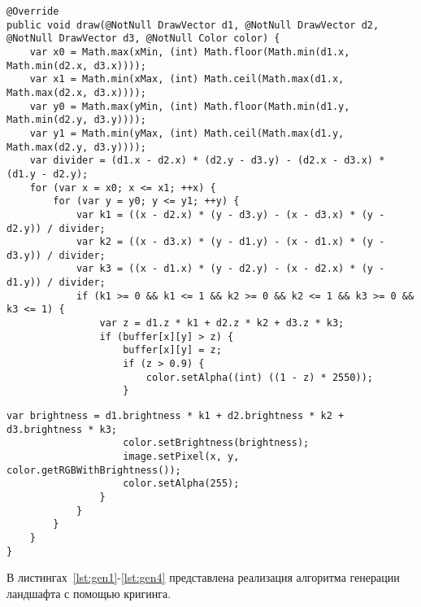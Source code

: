 \begin{lstlisting}[label=lst:z-buffer1,caption=Реализация алгоритма отрисовки полигона (начало)]
@Override
public void draw(@NotNull DrawVector d1, @NotNull DrawVector d2, @NotNull DrawVector d3, @NotNull Color color) {
	var x0 = Math.max(xMin, (int) Math.floor(Math.min(d1.x, Math.min(d2.x, d3.x))));
	var x1 = Math.min(xMax, (int) Math.ceil(Math.max(d1.x, Math.max(d2.x, d3.x))));
	var y0 = Math.max(yMin, (int) Math.floor(Math.min(d1.y, Math.min(d2.y, d3.y))));
	var y1 = Math.min(yMax, (int) Math.ceil(Math.max(d1.y, Math.max(d2.y, d3.y))));
	var divider = (d1.x - d2.x) * (d2.y - d3.y) - (d2.x - d3.x) * (d1.y - d2.y);
	for (var x = x0; x <= x1; ++x) {
		for (var y = y0; y <= y1; ++y) {
			var k1 = ((x - d2.x) * (y - d3.y) - (x - d3.x) * (y - d2.y)) / divider;
			var k2 = ((x - d3.x) * (y - d1.y) - (x - d1.x) * (y - d3.y)) / divider;
			var k3 = ((x - d1.x) * (y - d2.y) - (x - d2.x) * (y - d1.y)) / divider;
			if (k1 >= 0 && k1 <= 1 && k2 >= 0 && k2 <= 1 && k3 >= 0 && k3 <= 1) {
				var z = d1.z * k1 + d2.z * k2 + d3.z * k3;
				if (buffer[x][y] > z) {
					buffer[x][y] = z;
					if (z > 0.9) {
						color.setAlpha((int) ((1 - z) * 2550));
					}
\end{lstlisting}
\clearpage
\begin{lstlisting}[label=lst:z-buffer2,caption=Реализация алгоритма отрисовки полигона (окончание)]
					var brightness = d1.brightness * k1 + d2.brightness * k2 + d3.brightness * k3;
					color.setBrightness(brightness);
					image.setPixel(x, y, color.getRGBWithBrightness());
					color.setAlpha(255);
				}
			}
		}
	}
}
\end{lstlisting}

В листингах~\ref{lst:gen1}-\ref{lst:gen4} представлена реализация алгоритма генерации ландшафта с помощью кригинга.

